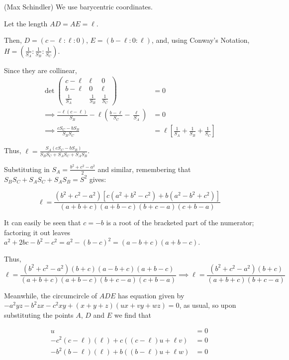 \begin{soln}
  (Max Schindler) We use barycentric coordinates.

  Let the length $AD=AE=\ell$.

  Then, $D=(c-\ell:\ell:0)$, $E=(b-\ell:0:\ell)$, and, using Conway's Notation, $H=\left(\frac{1}{S_A}:\frac{1}{S_B}:\frac{1}{S_C}\right)$.

  Since they are collinear,
  \begin{align*}
  \det \left(
  \begin{array}{ccc}
  c-\ell & \ell & 0 \\
  b-\ell & 0 & \ell \\
  \frac{1}{S_A} & \frac{1}{S_B} & \frac{1}{S_C}
  \end{array}
  \right) &=0 \\
  \implies \frac{-\ell(c-\ell)}{S_B}-\ell\left(\frac{b-\ell}{S_C}-\frac{\ell}{S_A}\right) &= 0 \\
  \implies \frac{cS_C-bS_B}{S_BS_C} &= \ell\left[\frac{1}{S_A}+\frac{1}{S_B}+\frac{1}{S_C}\right]
  \end{align*}



  Thus, $\ell = \frac{S_A(cS_C-bS_B)}{S_BS_C+S_AS_C+S_AS_B}$.

  Substituting in $S_A=\frac{b^2+c^2-a^2}{2}$ and similar, remembering that $S_BS_C+S_AS_C+S_AS_B=S^2$ gives:

  \[ \ell=\frac{(b^2+c^2-a^2)[c(a^2+b^2-c^2)+b(a^2-b^2+c^2)]}{(a+b+c)(a+b-c)(b+c-a)(c+b-a)}\]

  It can easily be seen that $c=-b$ is a root of the bracketed part of the numerator; factoring it out leaves $a^2+2bc-b^2-c^2=a^2-(b-c)^2=(a-b+c)(a+b-c)$.

  Thus, \[ \ell=\frac{(b^2+c^2-a^2)(b+c)(a-b+c)(a+b-c)}{(a+b+c)(a+b-c)(b+c-a)(c+b-a)} \implies \boxed{\ell = \frac{(b^2+c^2-a^2)(b+c)}{(a+b+c)(b+c-a)}}\]




  Meanwhile, the circumcircle of $ADE$ has equation given by $-a^2yz-b^2zx-c^2xy + (x+y+z)(ux+vy+wz) = 0$, as usual, so upon substituting the points $A$, $D$ and $E$ we find that

  \begin{align*}
     u &= 0 \\
     -c^2(c-\ell)(\ell) + c\left((c-\ell) u + \ell v\right) &= 0 \\
     -b^2(b-\ell)(\ell) + b\left((b-\ell) u + \ell w\right) &= 0
  \end{align*}


\end{soln}
